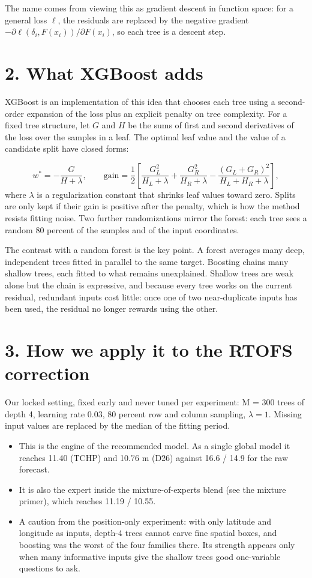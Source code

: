 \documentclass[11pt]{article}
\begin{document}
The name comes from viewing this as gradient descent in function space: for a general loss $\ell$, the residuals are replaced by the negative gradient $-\partial\ell(\delta_i, F(x_i))/\partial F(x_i)$, so each tree is a descent step.

\section*{2. What XGBoost adds}
XGBoost is an implementation of this idea that chooses each tree using a second-order expansion of the loss plus an explicit penalty on tree complexity. For a fixed tree structure, let $G$ and $H$ be the sums of first and second derivatives of the loss over the samples in a leaf. The optimal leaf value and the value of a candidate split have closed forms:

\[ w^{*} = -\frac{G}{H+\lambda}, \qquad \mathrm{gain} = \frac{1}{2}\left[ \frac{G_L^2}{H_L+\lambda} + \frac{G_R^2}{H_R+\lambda} - \frac{(G_L+G_R)^2}{H_L+H_R+\lambda} \right], \]
where $\lambda$ is a regularization constant that shrinks leaf values toward zero. Splits are only kept if their gain is positive after the penalty, which is how the method resists fitting noise. Two further randomizations mirror the forest: each tree sees a random 80 percent of the samples and of the input coordinates.

The contrast with a random forest is the key point. A forest averages many deep, independent trees fitted in parallel to the same target. Boosting chains many shallow trees, each fitted to what remains unexplained. Shallow trees are weak alone but the chain is expressive, and because every tree works on the current residual, redundant inputs cost little: once one of two near-duplicate inputs has been used, the residual no longer rewards using the other.

\section*{3. How we apply it to the RTOFS correction}
Our locked setting, fixed early and never tuned per experiment: M = 300 trees of depth 4, learning rate 0.03, 80 percent row and column sampling, $\lambda = 1$. Missing input values are replaced by the median of the fitting period.

\begin{itemize}
\item This is the engine of the recommended model. As a single global model it reaches 11.40 (TCHP) and 10.76 m (D26) against 16.6 / 14.9 for the raw forecast.
\item It is also the expert inside the mixture-of-experts blend (see the mixture primer), which reaches 11.19 / 10.55.
\item A caution from the position-only experiment: with only latitude and longitude as inputs, depth-4 trees cannot carve fine spatial boxes, and boosting was the worst of the four families there. Its strength appears only when many informative inputs give the shallow trees good one-variable questions to ask.
\end{itemize}
\end{document}
